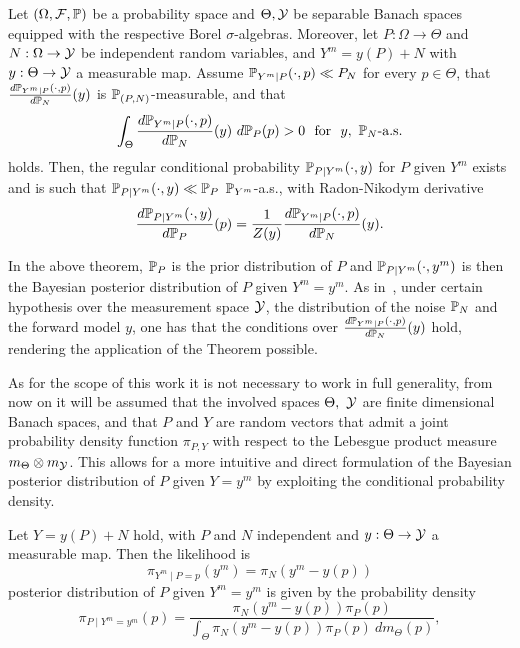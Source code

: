 \begin{thm}
    Let $ (\Omega, \mathcal F , \mathbb P) $ be a probability space and $\Theta, \mathcal Y$ be separable Banach spaces equipped with the respective Borel $\sigma$-algebras. 
    Moreover, let $P : \Omega \rightarrow \Theta$ and $N:\Omega \rightarrow \mathcal Y$ be independent random variables, and $ Y^m = y(P) + N$ with $y: \Theta \rightarrow \mathcal Y$ a measurable map. \newline
    Assume $\mathbb P_{Y^m\mid P}(\cdot, p) \ll P_N$ for every $p \in \Theta$, that $\frac{d \mathbb P_{Y^m\mid P}(\cdot, p)}{d\mathbb P_N}(y) $ is $\mathbb P_{(P,N)}$-measurable, and that 
    \[
        \int_\Theta \frac{d \mathbb P_{Y^m\mid P}(\cdot, p)}{d\mathbb P_N}(y) \ d\mathbb P_P(p) > 0 \ \text{ for }  \ y, \ \mathbb P_N \text{-a.s.}
    \]
    holds.
    Then, the regular conditional probability $\mathbb P_{P\mid Y^m}(\cdot,y)$ for $P$ given $Y^m$ exists and is such that $\mathbb P_{P\mid Y^m}(\cdot, y) \ll \mathbb P _P$ $\mathbb P_{Y^m}$-a.s., with Radon-Nikodym derivative
    \begin{equation}\label{eq:infdimBayes}
        \frac{d\mathbb P_{P\mid Y^m}(\cdot, y)}{d\mathbb P_P}(p) = \frac{1}{Z(y)}\frac{d\mathbb P_{Y^m\mid P}(\cdot, p)}{d\mathbb P_{N}}(y).
    \end{equation}
\end{thm}

In the above theorem, $\mathbb P_P$ is the prior distribution of $P$ and $\mathbb P_{P \mid Y^m}(\cdot, y^m)$ is then the Bayesian posterior distribution of $P$ given $Y^m=y^m$.
As in~\cite[Theorem 6.31]{Stuart2010}, under certain hypothesis over the measurement space $\mathcal Y$, the distribution of the noise $\mathbb P_N$ and the forward model $y$, one has that the conditions over $\frac{d \mathbb P_{Y^m\mid P}(\cdot, p)}{d\mathbb P_N}(y)$ hold, rendering the application of the Theorem possible. \medskip

As for the scope of this work it is not necessary to work in full generality, from now on it will be assumed that the involved spaces $\Theta, \  \mathcal Y$ are finite dimensional Banach spaces, and that $P$ and $Y$ are random vectors that admit a joint probability density function $\pi_{P,Y}$ with respect to the Lebesgue product measure $m_\Theta \otimes m_\mathcal Y$. This allows for a more intuitive and direct formulation of the Bayesian posterior distribution of $P$ given $Y=y^m$ by exploiting the conditional probability density.

\begin{thm}
    Let $Y = y(P) + N$ hold, with $P$ and $N$ independent and $y: \Theta \rightarrow \mathcal Y$ a measurable map.
    Then the likelihood is \[
        \pi_{Y^m\mid P = p}(y^m) = \pi_{N}(y^m - y( p) )
    \] posterior distribution of $P$ given $Y^m=y^m$ is given by the probability density \begin{equation}\label{eq:Bayes}
        \pi_{P\mid Y^m = y^m}(p) = \frac{\pi_{N}(y^m - y( p) ) \pi_P(p)}{\int_\Theta  \pi_{N}(y^m - y( p) ) \pi_P(p) \ dm_\Theta(p)},
    \end{equation}
\end{thm}

